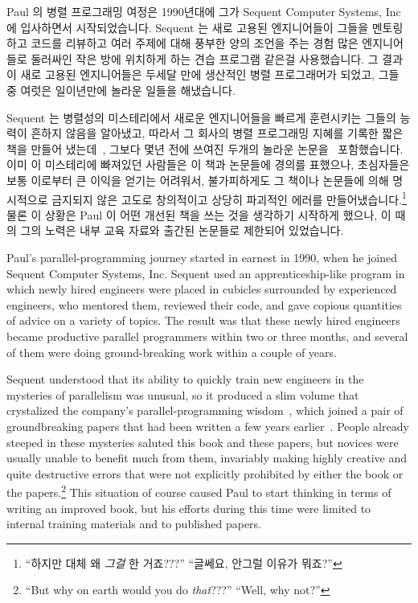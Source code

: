 \fi

Paul 의 병렬 프로그래밍 여정은 1990년대에 그가 Sequent Computer Systems, Inc 에
입사하면서 시작되었습니다.
Sequent 는 새로 고용된 엔지니어들이 그들을 멘토링하고 코드를 리뷰하고 여러
주제에 대해 풍부한 양의 조언을 주는 경험 많은 엔지니어들로 둘러싸인 작은 방에
위치하게 하는 견습 프로그램 같은걸 사용했습니다.
그 결과 이 새로 고용된 엔지니어들은 두세달 만에 생산적인 병렬 프로그래머가
되었고, 그들 중 여럿은 일이년만에 놀라운 일들을 해냈습니다.

Sequent 는 병렬성의 미스테리에서 새로운 엔지니어들을 빠르게 훈련시키는 그들의
능력이 흔하지 않음을 알아냈고, 따라서 그 회사의 병렬 프로그래밍 지혜를 기록한
짧은 책을 만들어 냈는데~\cite{SQNTParallel}, 그보다 몇년 전에 쓰여진 두개의
놀라운 논문을~\cite{Beck85,Inman85} 포함했습니다.
이미 이 미스테리에 빠져있던 사람들은 이 책과 논문들에 경의를 표했으나,
초심자들은 보통 이로부터 큰 이익을 얻기는 어려워서, 불가피하게도 그 책이나
논문들에 의해 명시적으로 금지되지 않은 고도로 창의적이고 상당히 파괴적인 에러를
만들어냈습니다.\footnote{
	``하지만 대체 왜 \emph{그걸} 한 거죠???''
	``글쎄요, 안그럴 이유가 뭐죠?''}
물론 이 상황은 Paul 이 어떤 개선된 책을 쓰는 것을 생각하기 시작하게 했으나, 이
때의 그의 노력은 내부 교육 자료와 출간된 논문들로 제한되어 있었습니다.

\iffalse

Paul's parallel-programming journey started in earnest in 1990, when
he joined Sequent Computer Systems, Inc.
Sequent used an apprenticeship-like program in which newly hired engineers
were placed in cubicles surrounded by experienced engineers, who mentored
them, reviewed their code, and gave copious quantities of advice on
a variety of topics.
The result was that these newly hired engineers became productive parallel
programmers within two or three months, and several of them were doing
ground-breaking work within a couple of years.

Sequent understood that its ability to quickly train new engineers in the
mysteries of parallelism was unusual, so it produced a slim volume that
crystalized the company's parallel-programming wisdom~\cite{SQNTParallel},
which joined a pair of groundbreaking papers that had been written a
few years earlier~\cite{Beck85,Inman85}.
People already steeped in these mysteries saluted this book and these
papers, but novices were usually unable to benefit much from them,
invariably making highly creative and quite destructive errors that
were not explicitly prohibited by either the book or the papers.\footnote{
	``But why on earth would you do \emph{that}???''
	``Well, why not?''}
This situation of course caused Paul to start thinking in terms of
writing an improved book, but his efforts during this time were limited
to internal training materials and to published papers.


